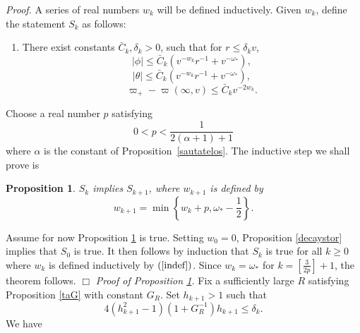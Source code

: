 \documentclass{article}
\newtheorem{proposition}{Proposition}[section]
\begin{document}
\noindent\emph{Proof.}
A series of real numbers $w_k$ will be defined inductively.
Given $w_k$, define the statement $S_k$ as follows:
\begin{enumerate}
\item[($S_k$)]
There exist
constants $\bar{C}_k, \delta_k>0$, such that
for $r\le\delta_k v$,
\begin{equation}
\label{22y}
|\phi|\le \bar{C}_k\left(v^{-w_k}r^{-1}+ v^{-\omega_*}\right),
\end{equation}
\begin{equation}
\label{33y}
|\theta|\le \bar{C}_k\left(v^{-w_k}r^{-1}+v^{-\omega_*}\right),
\end{equation}
\begin{equation}
\label{11y}
\varpi_+-\varpi(\infty,v)\le\bar{C}_kv^{-2w_k}.
\end{equation}
\end{enumerate}
Choose a real number $p$ satisfying
\begin{equation}
\label{pepilogn}
0<p<\frac{1}{2(\alpha+1)+1}
\end{equation}
where $\alpha$ is the constant of Proposition~\ref{sautatelos}.
The 
inductive step we shall prove is
\begin{proposition}
\label{inductstep}
$S_k$ implies $S_{k+1}$, where $w_{k+1}$
is defined by
\begin{equation}
\label{indef}
w_{k+1}=\min\left\{w_k+p,\omega_*-\frac12\right\}.
\end{equation}
\end{proposition}
Assume for now Proposition \ref{inductstep} is true.
Setting $w_0=0$, Proposition \ref{decaystor} implies that
$S_0$ is true. It then
follows by induction
that $S_k$ is true for all $k\ge0$ where $w_{k}$ is defined inductively
by $(\ref{indef})$. 
Since $w_k=\omega_*$ for $k=[\frac{3}{2p}]+1$,
the theorem follows. $\Box$
\vskip1pc
\noindent\emph{Proof of Proposition \ref{inductstep}.}
Fix a sufficiently large $R$ satisfying Proposition \ref{taG}
with constant $G_R$. Set $h_{k+1}>1$ such that
\begin{equation}
\label{hepi}
4(h_{k+1}^2-1)(1+G_R^{-1})h_{k+1}\le \delta_k.
\end{equation}
We have
\end{document}
